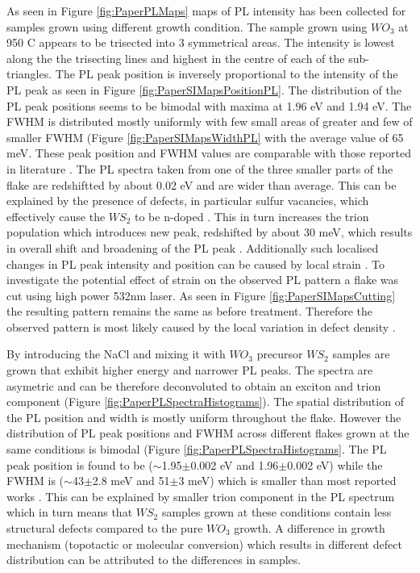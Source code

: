 As seen in Figure \ref{fig:PaperPLMaps} maps of PL intensity has been collected for samples grown using different growth condition. The sample grown using $WO_3$ at 950 {\degree}C appears to be trisected into 3 symmetrical areas. The intensity is lowest along the the trisecting lines and highest in the centre of each of the sub-triangles. The PL peak position is inversely proportional to the intensity of the PL peak as seen in Figure \ref{fig:PaperSIMapsPositionPL}. The distribution of the PL peak positions seems to be bimodal with maxima at 1.96 eV and 1.94 eV. The FWHM is distributed mostly uniformly with few small areas of greater and few of smaller FWHM (Figure \ref{fig:PaperSIMapsWidthPL} with the average value of 65 meV. These peak position and FWHM values are comparable with those reported in literature \cite{ExtraordinaryRoomTemperaturePhotoluminescenceInTriangularWS2Monolayers}\cite{Rong2014}\cite{Hu2016}\cite{Kang2015a}. The PL spectra taken from one of the three smaller parts of the flake are redshiftted by about 0.02 eV and are wider than average. This can be explained by the presence of defects, in particular sulfur vacancies, which effectively cause the $WS_2$ to be n-doped \cite{Hui2013}\cite{Peimyoo2014}. This in turn increases the trion population which introduces new peak, redshifted by about 30 meV, which results in overall shift and broadening of the PL peak \cite{Tongay2013}\cite{ExtraordinaryRoomTemperaturePhotoluminescenceInTriangularWS2Monolayers}. Additionally such localised changes in PL peak intensity and position can be caused by local strain \cite{Liu2014}\cite{Hui2013}. To investigate the potential effect of strain on the observed PL pattern a flake was cut using high power 532nm laser. As seen in Figure \ref{fig:PaperSIMapsCutting} the resulting pattern remains the same as before treatment. Therefore the observed pattern is most likely caused by the local variation in defect density \cite{Liu2016}.

By introducing the NaCl and mixing it with $WO_3$ precursor $WS_2$ samples are grown that exhibit higher energy and narrower PL peaks. The spectra are asymetric and can be therefore deconvoluted to obtain an exciton and trion component (Figure \ref{fig:PaperPLSpectraHistograms}). The spatial distribution of the PL position and width is mostly uniform throughout the flake. However the distribution of PL peak positions and FWHM across different flakes grown at the same conditions is bimodal (Figure \ref{fig:PaperPLSpectraHistograms}. The PL peak position is found to be ({$\sim$}1.95{$\pm$}0.002 eV and 1.96{$\pm$}0.002 eV) while the FWHM is ({$\sim$}43{$\pm$}2.8 meV and 51{$\pm$}3 meV) which is smaller than most reported works \cite{ExtraordinaryRoomTemperaturePhotoluminescenceInTriangularWS2Monolayers}\cite{Rong2014}\cite{Hu2016}\cite{Kang2015a}. This can be explained by smaller trion component in the PL spectrum which in turn means that $WS_2$ samples grown at these conditions contain less structural defects compared to the pure $WO_3$ growth. A difference in growth mechanism (topotactic or molecular conversion) which results in different defect distribution can be attributed to the differences in samples.

